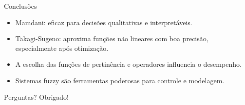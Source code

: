 \documentclass[aspectratio=169]{beamer}
\begin{document}
\begin{frame}{Conclusões}
    \begin{itemize}
        \item Mamdani: eficaz para decisões qualitativas e interpretáveis.
        \item Takagi-Sugeno: aproxima funções não lineares com boa precisão, especialmente após otimização.
        \item A escolha das funções de pertinência e operadores influencia o desempenho.
        \item Sistemas fuzzy são ferramentas poderosas para controle e modelagem.
    \end{itemize}
\end{frame}

\begin{frame}{Perguntas?}
    \centering
    \Huge Obrigado!
\end{frame}
\end{document}
